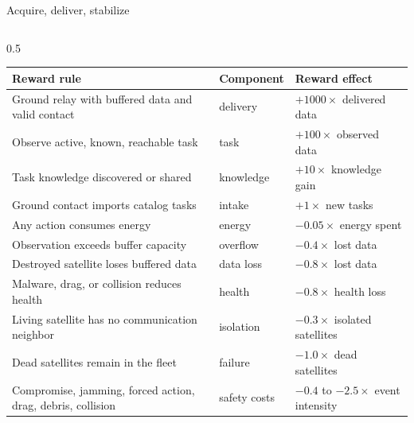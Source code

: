 \documentclass[aspectratio=169]{beamer}
\begin{document}
\begin{frame}{Acquire, deliver, stabilize}
\begin{columns}[c,totalwidth=\textwidth]
\begin{column}{0.5\textwidth}
\begin{tabularx}{\linewidth}{p{3cm}p{.8cm} X}
        Reward rule & Component                               & Reward effect \\
        \midrule

        Ground relay with buffered data and valid contact
                    & delivery
                    & $+1000 \times$ delivered data                           \\

        Observe active, known, reachable task
                    & task
                    & $+100 \times$ observed data                             \\

        Task knowledge discovered or shared
                    & knowledge
                    & $+10 \times$ knowledge gain                             \\

        Ground contact imports catalog tasks
                    & intake
                    & $+1 \times$ new tasks                                   \\

        Any action consumes energy
                    & energy
                    & $-0.05 \times$ energy spent                             \\

        Observation exceeds buffer capacity
                    & overflow
                    & $-0.4 \times$ lost data                                 \\

        Destroyed satellite loses buffered data
                    & data loss
                    & $-0.8 \times$ lost data                                 \\

        Malware, drag, or collision reduces health
                    & health
                    & $-0.8 \times$ health loss                               \\

        Living satellite has no communication neighbor
                    & isolation
                    & $-0.3 \times$ isolated satellites                       \\

        Dead satellites remain in the fleet
                    & failure
                    & $-1.0 \times$ dead satellites                           \\

        Compromise, jamming, forced action, drag, debris, collision
                    & safety costs
                    & $-0.4$ to $-2.5 \times$ event intensity                 \\


\end{tabularx}
\end{column}
\end{columns}
\end{frame}
\end{document}
